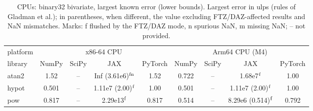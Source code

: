 \begin{table}
\centering
\begin{small}
\begin{tabular}{|l|cccc|cccc|}
\hline
platform & \multicolumn{4}{c|}{x86-64 CPU} & \multicolumn{4}{c|}{Arm64 CPU (M4)} \\
library & NumPy & SciPy & JAX & PyTorch & NumPy & SciPy & JAX & PyTorch \\ \hline
atan2 & 1.52 & -- & Inf (3.61e6)$^{\rm fn}$ & 1.52 & 0.722 & -- & 1.68e7$^{\rm f}$ & 1.00 \\
hypot & 0.501 & -- & 1.11e7 (2.00)$^{\rm f}$ & 1.00 & 0.501 & -- & 1.11e7 (2.00)$^{\rm f}$ & 1.00 \\
pow & 0.817 & -- & 2.29e13$^{\rm f}$ & 0.817 & 0.514 & -- & 8.29e6 (0.514)$^{\rm f}$ & 0.792 \\
\hline
\end{tabular}
\end{small}
\caption{CPUs: binary32 bivariate, largest known error (lower bounds). Largest error in ulps (rules of Gladman et al.); in parentheses, when different, the value excluding FTZ/DAZ-affected results and NaN mismatches. Marks: f flushed by the FTZ/DAZ mode, n spurious NaN, m missing NaN; -- not provided.}
\label{tab:b32bicpu}
\end{table}
